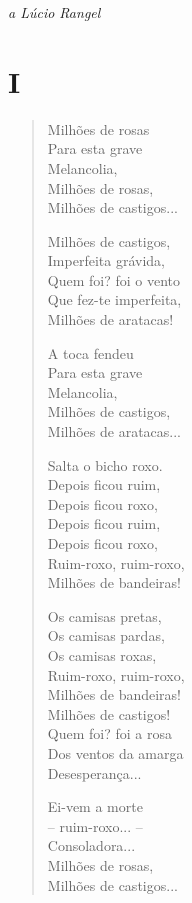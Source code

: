 
\begin{flushright}
\emph{a Lúcio Rangel}
\end{flushright}

\section{I}

\begin{verse}
Milhões de rosas\\
Para esta grave\\
Melancolia,\\
Milhões de rosas,\\
Milhões de castigos...

Milhões de castigos,\\
Imperfeita grávida,\\
Quem foi? foi o vento\\
Que fez-te imperfeita,\\
Milhões de aratacas!

A toca fendeu\\
Para esta grave\\
Melancolia,\\
Milhões de castigos,\\
Milhões de aratacas...

Salta o bicho roxo.\\
Depois ficou ruim,\\
Depois ficou roxo,\\
Depois ficou ruim,\\
Depois ficou roxo,\\
Ruim-roxo, ruim-roxo,\\
Milhões de bandeiras!

Os camisas pretas,\\
Os camisas pardas,\\
Os camisas roxas,\\
Ruim-roxo, ruim-roxo,\\
Milhões de bandeiras!\\
Milhões de castigos!\\
Quem foi? foi a rosa\\
Dos ventos da amarga\\
Desesperança...

Ei-vem a morte\\
-- ruim-roxo... --\\
Consoladora...\\
Milhões de rosas,\\
Milhões de castigos...
\end{verse}

